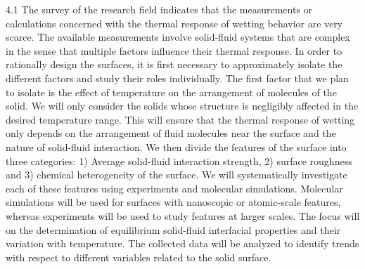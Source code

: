 \par 4.1 The survey of the research field indicates that the measurements or calculations concerned with the thermal response of wetting behavior are very scarce. The available measurements involve solid-fluid systems that are complex in the sense that multiple factors influence their thermal response. In order to rationally design the surfaces, it is first necessary to approximately isolate the different factors and study their roles individually. The first factor that we plan to isolate is the effect of temperature on the arrangement of molecules of the solid. We will only consider the solids whose structure is negligibly affected in the desired temperature range. This will ensure that the thermal response of wetting only depends on the arrangement of fluid molecules near the surface and the nature of solid-fluid interaction. We then divide the features of the surface into three categories: 1) Average solid-fluid interaction strength, 2) surface roughness and 3) chemical heterogeneity of the surface. We will systematically investigate each of these features using experiments and molecular simulations. Molecular simulations will be used for surfaces with nanoscopic or atomic-scale features, whereas experiments will be used to study features at larger scales. The focus will on the determination of equilibrium solid-fluid interfacial properties and their variation with temperature. The collected data will be analyzed to identify trends with respect to different variables related to the solid surface.
